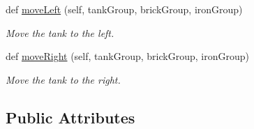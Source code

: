 \begin{DoxyCompactItemize}
def \mbox{\hyperlink{classmy_tank_1_1_my_tank_a1043ccc9e1f949c55db5556e383b7158}{move\+Left}} (self, tank\+Group, brick\+Group, iron\+Group)
\begin{DoxyCompactList}\small\item\em Move the tank to the left. \end{DoxyCompactList}\item 
def \mbox{\hyperlink{classmy_tank_1_1_my_tank_a38bb2c3fb22e641254ab6509bbae3690}{move\+Right}} (self, tank\+Group, brick\+Group, iron\+Group)
\begin{DoxyCompactList}\small\item\em Move the tank to the right. \end{DoxyCompactList}\end{DoxyCompactItemize}
\subsection*{Public Attributes}
